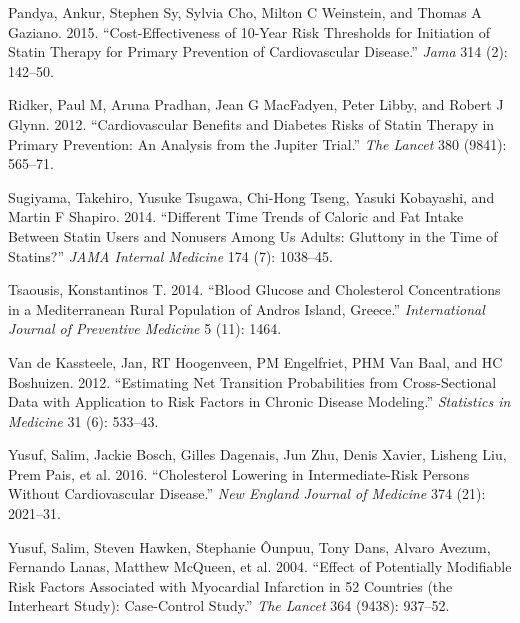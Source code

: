 \documentclass[
  12pt,
]{article}
\begin{document}
\leavevmode\hypertarget{ref-pandya2015}{}%
Pandya, Ankur, Stephen Sy, Sylvia Cho, Milton C Weinstein, and Thomas A Gaziano. 2015. ``Cost-Effectiveness of 10-Year Risk Thresholds for Initiation of Statin Therapy for Primary Prevention of Cardiovascular Disease.'' \emph{Jama} 314 (2): 142--50.

\leavevmode\hypertarget{ref-ridker2012}{}%
Ridker, Paul M, Aruna Pradhan, Jean G MacFadyen, Peter Libby, and Robert J Glynn. 2012. ``Cardiovascular Benefits and Diabetes Risks of Statin Therapy in Primary Prevention: An Analysis from the Jupiter Trial.'' \emph{The Lancet} 380 (9841): 565--71.

\leavevmode\hypertarget{ref-sugiyama2014}{}%
Sugiyama, Takehiro, Yusuke Tsugawa, Chi-Hong Tseng, Yasuki Kobayashi, and Martin F Shapiro. 2014. ``Different Time Trends of Caloric and Fat Intake Between Statin Users and Nonusers Among Us Adults: Gluttony in the Time of Statins?'' \emph{JAMA Internal Medicine} 174 (7): 1038--45.

\leavevmode\hypertarget{ref-tsaousis2014}{}%
Tsaousis, Konstantinos T. 2014. ``Blood Glucose and Cholesterol Concentrations in a Mediterranean Rural Population of Andros Island, Greece.'' \emph{International Journal of Preventive Medicine} 5 (11): 1464.

\leavevmode\hypertarget{ref-van2012estimating}{}%
Van de Kassteele, Jan, RT Hoogenveen, PM Engelfriet, PHM Van Baal, and HC Boshuizen. 2012. ``Estimating Net Transition Probabilities from Cross-Sectional Data with Application to Risk Factors in Chronic Disease Modeling.'' \emph{Statistics in Medicine} 31 (6): 533--43.

\leavevmode\hypertarget{ref-yusuf2016}{}%
Yusuf, Salim, Jackie Bosch, Gilles Dagenais, Jun Zhu, Denis Xavier, Lisheng Liu, Prem Pais, et al. 2016. ``Cholesterol Lowering in Intermediate-Risk Persons Without Cardiovascular Disease.'' \emph{New England Journal of Medicine} 374 (21): 2021--31.

\leavevmode\hypertarget{ref-yusuf2004effect}{}%
Yusuf, Salim, Steven Hawken, Stephanie Ôunpuu, Tony Dans, Alvaro Avezum, Fernando Lanas, Matthew McQueen, et al. 2004. ``Effect of Potentially Modifiable Risk Factors Associated with Myocardial Infarction in 52 Countries (the Interheart Study): Case-Control Study.'' \emph{The Lancet} 364 (9438): 937--52.
\end{document}
